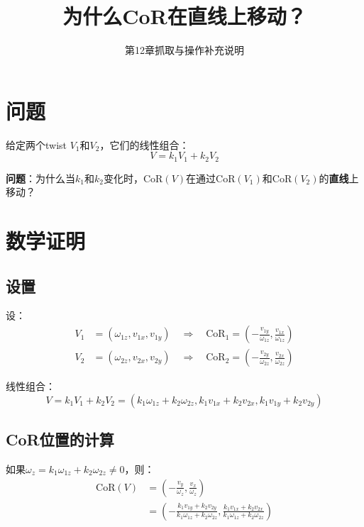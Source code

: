 \documentclass[12pt,a4paper]{article}
\title{为什么CoR在直线上移动？}
\author{第12章抓取与操作补充说明}
\date{}
\begin{document}
\maketitle

\section{问题}

给定两个twist $V_1$和$V_2$，它们的线性组合：
\begin{equation}
V = k_1 V_1 + k_2 V_2
\end{equation}

\textbf{问题}：为什么当$k_1$和$k_2$变化时，$\text{CoR}(V)$在通过$\text{CoR}(V_1)$和$\text{CoR}(V_2)$的\textbf{直线}上移动？

\section{数学证明}

\subsection{设置}

设：
\begin{align}
V_1 &= (\omega_{1z}, v_{1x}, v_{1y}) \quad \Rightarrow \quad \text{CoR}_1 = \left(-\frac{v_{1y}}{\omega_{1z}}, \frac{v_{1x}}{\omega_{1z}}\right) \\
V_2 &= (\omega_{2z}, v_{2x}, v_{2y}) \quad \Rightarrow \quad \text{CoR}_2 = \left(-\frac{v_{2y}}{\omega_{2z}}, \frac{v_{2x}}{\omega_{2z}}\right)
\end{align}

线性组合：
\begin{equation}
V = k_1 V_1 + k_2 V_2 = (k_1 \omega_{1z} + k_2 \omega_{2z}, k_1 v_{1x} + k_2 v_{2x}, k_1 v_{1y} + k_2 v_{2y})
\end{equation}

\subsection{CoR位置的计算}

如果$\omega_z = k_1 \omega_{1z} + k_2 \omega_{2z} \neq 0$，则：
\begin{align}
\text{CoR}(V) &= \left(-\frac{v_y}{\omega_z}, \frac{v_x}{\omega_z}\right) \\
&= \left(-\frac{k_1 v_{1y} + k_2 v_{2y}}{k_1 \omega_{1z} + k_2 \omega_{2z}}, \frac{k_1 v_{1x} + k_2 v_{2x}}{k_1 \omega_{1z} + k_2 \omega_{2z}}\right)
\label{eq:cor_combination}
\end{align}
\end{document}
